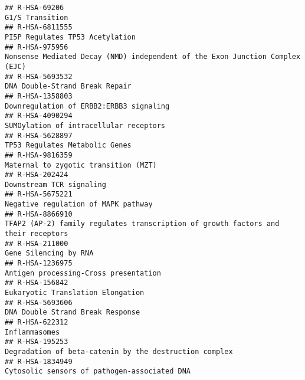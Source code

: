 \documentclass[
]{article}
\begin{document}
\begin{verbatim}
## R-HSA-69206                                                                                                                        G1/S Transition
## R-HSA-6811555                                                                                                      PI5P Regulates TP53 Acetylation
## R-HSA-975956                                                          Nonsense Mediated Decay (NMD) independent of the Exon Junction Complex (EJC)
## R-HSA-5693532                                                                                                       DNA Double-Strand Break Repair
## R-HSA-1358803                                                                                              Downregulation of ERBB2:ERBB3 signaling
## R-HSA-4090294                                                                                               SUMOylation of intracellular receptors
## R-HSA-5628897                                                                                                       TP53 Regulates Metabolic Genes
## R-HSA-9816359                                                                                                 Maternal to zygotic transition (MZT)
## R-HSA-202424                                                                                                              Downstream TCR signaling
## R-HSA-5675221                                                                                                  Negative regulation of MAPK pathway
## R-HSA-8866910                                                    TFAP2 (AP-2) family regulates transcription of growth factors and their receptors
## R-HSA-211000                                                                                                                 Gene Silencing by RNA
## R-HSA-1236975                                                                                                Antigen processing-Cross presentation
## R-HSA-156842                                                                                                     Eukaryotic Translation Elongation
## R-HSA-5693606                                                                                                     DNA Double Strand Break Response
## R-HSA-622312                                                                                                                         Inflammasomes
## R-HSA-195253                                                                                Degradation of beta-catenin by the destruction complex
## R-HSA-1834949                                                                                        Cytosolic sensors of pathogen-associated DNA 

\end{verbatim}
\end{document}
